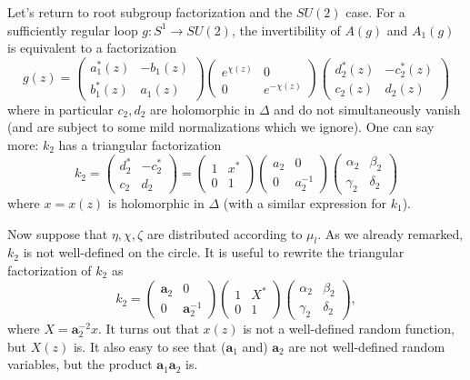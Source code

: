 \documentclass{amsart}
\theoremstyle{conjecture}
\theoremstyle{definition}
\theoremstyle{question}
\theoremstyle{questions}
\theoremstyle{remark}
\theoremstyle{remarks}
\theoremstyle{example}
\numberwithin{equation}{section}
\begin{document}
Let's return to root subgroup factorization and the $SU(2)$ case. For a sufficiently regular
loop $g:S^1 \to SU(2)$, the invertibility of $A(g)$ and $A_1(g)$ is equivalent to a
factorization
\begin{equation}\label{coordinate2}g(z)=\left(\begin{matrix}a_1^*(z)&-b_1(z)\\b_1^*(z)&a_1(z)\end{matrix}\right)\left(\begin{matrix} e^{\chi(z)}&0\\
0&e^{-\chi(z)}\end{matrix} \right)\left(\begin{matrix}d_2^*(z)&-c_2^*(z)\\c_2(z)&d_2(z)\end{matrix}\right)
\end{equation}
where in particular $c_2,d_2$ are holomorphic in $\Delta$ and do not simultaneously vanish (and are subject to some mild normalizations which we ignore). One can say more: $k_2$ has a triangular factorization
\begin{equation}\label{k2formula}k_2=\left(\begin{matrix}d_2^*&-c_2^*\\c_2&d_2\end{matrix}\right)=
\left(\begin{matrix} 1&x^{*}\\
0&1\end{matrix} \right)\left(\begin{matrix} a_2&0\\
0&a_2^{-1}\end{matrix} \right)\left(\begin{matrix} \alpha_2&\beta_2\\
\gamma_2&\delta_2\end{matrix} \right)\end{equation}
where $x=x(z)$ is holomorphic in $\Delta$ (with a similar expression for $k_1$).

Now suppose that $\eta,\chi,\zeta$ are distributed according to $\mu_l$. As we already remarked,
$k_2$ is not well-defined on the circle. It is useful to rewrite the triangular factorization of $k_2$ as
\begin{equation}\label{k2formula2}k_2=\left(\begin{matrix} \mathbf a_2&0\\
0&\mathbf a_2^{-1}\end{matrix} \right)\left(\begin{matrix} 1&X^{*}\\
0&1\end{matrix} \right)\left(\begin{matrix} \alpha_2&\beta_2\\
\gamma_2&\delta_2\end{matrix} \right) ,\end{equation} where
$X=\mathbf a_2^{-2}x$. It turns out that $x(z)$ is not a well-defined random function, but $X(z)$ is.
It also easy to see that ($\mathbf a_1$ and) $\mathbf a_2$ are not well-defined random variables,
but the product $\mathbf a_1\mathbf a_2$ is.
\end{document}
